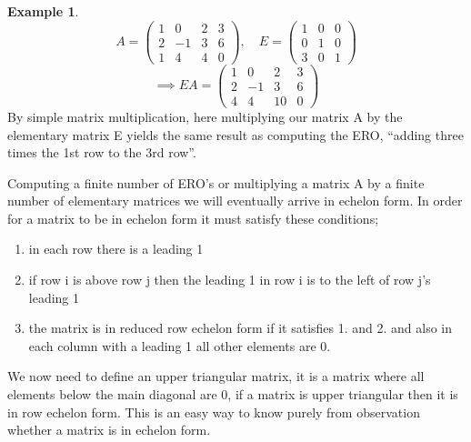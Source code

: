 \documentclass[12pt,reqno,twoside,titlepage]{article}
\theoremstyle{definition}
\newtheorem{exmp}{Example}[section]
\begin{document}
\begin{exmp}
\begin{equation*}
 A = 
\begin{pmatrix}
 1 & 0 & 2 & 3 \\
 2 & -1 & 3 & 6 \\
 1 & 4 & 4 & 0
\end{pmatrix}
   ,
  \quad
  E = 
\begin{pmatrix}
1 & 0 & 0 \\
0 & 1 & 0 \\
3 & 0 & 1
\end{pmatrix}
\end{equation*}
\newline
\begin{equation*}
\implies EA = 
\begin{pmatrix}
1 & 0 & 2 & 3 \\
2 & -1 & 3 & 6 \\
4 & 4 & 10 & 0
\end{pmatrix}
\end{equation*}
\newline
By simple matrix multiplication, here multiplying our matrix A by the elementary matrix E yields the same result as computing the ERO, “adding three times the 1st row to the 3rd row”.
\end{exmp}

Computing a finite number of ERO’s or multiplying a matrix A by a finite number of elementary matrices we will eventually arrive in echelon form. In order for a matrix to be in echelon form it must satisfy these conditions;

\begin{enumerate}
    \item in each row there is a leading 1
    \item if row i is above row j then the leading 1 in row i is to the left of row j’s leading 1
    \item the matrix is in reduced row echelon form if it satisfies 1. and 2. and also in each column with a leading 1 all other elements are 0.
\end{enumerate}

We now need to define an upper triangular matrix, it is a matrix where all elements below the main diagonal are 0, if a matrix is upper triangular then it is in row echelon form. This is an easy way to know purely from observation whether a matrix is in echelon form.
\end{document}
